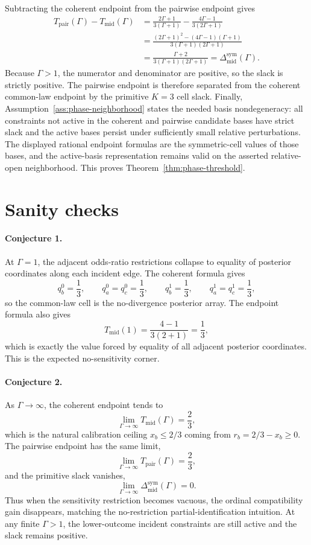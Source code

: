 \documentclass[11pt]{article}
\theoremstyle{definition}
\theoremstyle{plain}
\theoremstyle{remark}
\begin{document}
Subtracting the coherent endpoint from the pairwise endpoint gives
\[
\begin{aligned}
  T_{\mathrm{pair}}(\Gamma)-T_{\mathrm{mid}}(\Gamma)
  &=
  \frac{2\Gamma+1}{3(\Gamma+1)}
  -
  \frac{4\Gamma-1}{3(2\Gamma+1)}
  \\
  &=
  \frac{(2\Gamma+1)^2-(4\Gamma-1)(\Gamma+1)}
       {3(\Gamma+1)(2\Gamma+1)}
  \\
  &=
  \frac{\Gamma+2}{3(\Gamma+1)(2\Gamma+1)}
  =
  \Delta_{\mathrm{mid}}^{\mathrm{sym}}(\Gamma).
\end{aligned}
\]
Because \(\Gamma>1\), the numerator and denominator are positive, so the slack is strictly positive.  The pairwise endpoint is therefore separated from the coherent common-law endpoint by the primitive \(K=3\) cell slack.  Finally, Assumption~\ref{ass:phase-neighborhood} states the needed basis nondegeneracy: all constraints not active in the coherent and pairwise candidate bases have strict slack and the active bases persist under sufficiently small relative perturbations.  The displayed rational endpoint formulas are the symmetric-cell values of those bases, and the active-basis representation remains valid on the asserted relative-open neighborhood.  This proves Theorem~\ref{thm:phase-threshold}.

\section{Sanity checks}
\paragraph{Conjecture 1.}
At \(\Gamma=1\), the adjacent odds-ratio restrictions collapse to equality of posterior coordinates along each incident edge.  The coherent formula gives
\[
  q_b^0=\frac13,\qquad q_a^0=q_c^0=\frac13,\qquad
  q_b^1=\frac13,\qquad q_a^1=q_c^1=\frac13,
\]
so the common-law cell is the no-divergence posterior array.  The endpoint formula also gives
\[
  T_{\mathrm{mid}}(1)=\frac{4-1}{3(2+1)}=\frac13,
\]
which is exactly the value forced by equality of all adjacent posterior coordinates.  This is the expected no-sensitivity corner.

\paragraph{Conjecture 2.}
As \(\Gamma\to\infty\), the coherent endpoint tends to
\[
  \lim_{\Gamma\to\infty}T_{\mathrm{mid}}(\Gamma)=\frac23,
\]
which is the natural calibration ceiling \(x_b\le 2/3\) coming from \(r_b=2/3-x_b\ge0\).  The pairwise endpoint has the same limit,
\[
  \lim_{\Gamma\to\infty}T_{\mathrm{pair}}(\Gamma)=\frac23,
\]
and the primitive slack vanishes,
\[
  \lim_{\Gamma\to\infty}\Delta_{\mathrm{mid}}^{\mathrm{sym}}(\Gamma)=0.
\]
Thus when the sensitivity restriction becomes vacuous, the ordinal compatibility gain disappears, matching the no-restriction partial-identification intuition.  At any finite \(\Gamma>1\), the lower-outcome incident constraints are still active and the slack remains positive.
\end{document}
